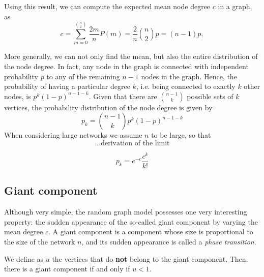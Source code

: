Using this result, we can compute the expected mean node degree $c$ in a graph, as
\begin{equation}
	c = \sum^{\binom{n}{2}}_{m=0} \frac{2m}{n} P(m) = \frac{2}{n} \binom{n}{2} p = (n-1) p,
\end{equation}

More generally, we can not only find the mean, but also the entire distribution of the node degree.
In fact, any node in the graph is connected with independent probability $p$ to any of the remaining $n-1$ nodes in the graph.
Hence, the probability of having a particular degree $k$, i.e. being connected to exactly $k$ other nodes, is $p^k (1-p)^{n-1-k}$.
Given that there are $\binom{n-1}{k}$ possible sets of $k$ vertices, the probability distribution of the node degree is given by
\begin{equation}
	p_k = \binom{n-1}{k} p^k (1-p)^{n-1-k}
\end{equation}
When considering large networks we assume $n$ to be large, so that 
$$\ldots   \textrm{derivation of the limit}$$

\begin{equation}
	p_k = e^{-c} \frac{c^k}{k!}
\end{equation}






\subsection{Giant component} %
\label{sub:giant_component}

Although very simple, the random graph model possesses one very interesting property: the sudden appearance of the so-called giant component by varying the mean degree $c$.
A giant component is a component whose size is proportional to the size of the network $n$, and its sudden appearance is called a \textit{phase transition}.

We define as $u$ the vertices that do \textbf{not} belong to the giant component.
Then, there is a giant component if and only if $u<1$.

